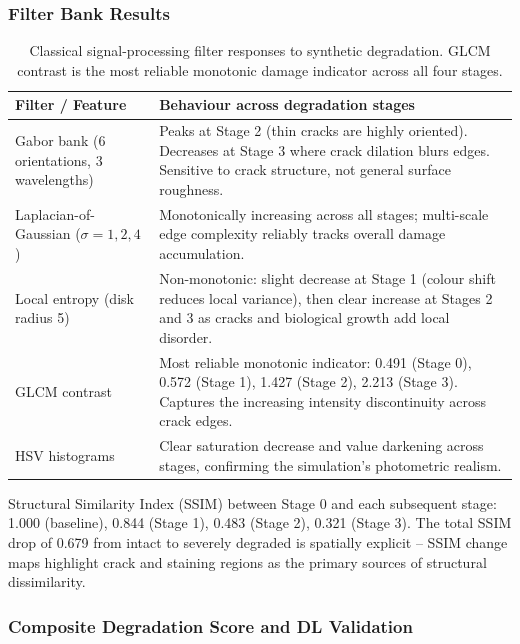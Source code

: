 \documentclass[12pt,a4paper]{article}
\begin{document}
\subsubsection{Filter Bank Results}

\begin{table}[H]
\centering
\caption{Classical signal-processing filter responses to synthetic degradation. GLCM contrast is the most reliable monotonic damage indicator across all four stages.}
\label{tab:filter_bank}
\begin{tabular}{lp{9.5cm}}
\toprule
\rowcolor{white}
\textbf{Filter / Feature} & \textbf{Behaviour across degradation stages} \\
\midrule
Gabor bank (6 orientations, 3 wavelengths) & Peaks at Stage 2 (thin cracks are highly oriented). Decreases at Stage 3 where crack dilation blurs edges. Sensitive to crack structure, not general surface roughness. \\
Laplacian-of-Gaussian ($\sigma = 1, 2, 4$) & Monotonically increasing across all stages; multi-scale edge complexity reliably tracks overall damage accumulation. \\
Local entropy (disk radius 5) & Non-monotonic: slight decrease at Stage 1 (colour shift reduces local variance), then clear increase at Stages 2 and 3 as cracks and biological growth add local disorder. \\
GLCM contrast & Most reliable monotonic indicator: 0.491 (Stage 0), 0.572 (Stage 1), 1.427 (Stage 2), 2.213 (Stage 3). Captures the increasing intensity discontinuity across crack edges. \\
HSV histograms & Clear saturation decrease and value darkening across stages, confirming the simulation's photometric realism. \\
\bottomrule
\end{tabular}
\end{table}

Structural Similarity Index (SSIM) between Stage 0 and each subsequent stage: 1.000 (baseline), 0.844 (Stage 1), 0.483 (Stage 2), 0.321 (Stage 3). The total SSIM drop of 0.679 from intact to severely degraded is spatially explicit -- SSIM change maps highlight crack and staining regions as the primary sources of structural dissimilarity.

\subsubsection{Composite Degradation Score and DL Validation}
\end{document}
